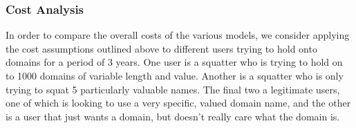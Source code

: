 \subsubsection{Cost Analysis}
    In order to compare the overall costs of the various models, we consider applying the cost assumptions outlined above to different users trying to hold onto domains for a period of 3 years. One user is a squatter who is trying to hold on to 1000 domains of variable length and value. Another is a squatter who is only trying to squat 5 particularly valuable names. The final two a legitimate users, one of which is looking to use a very specific, valued domain name, and the other is a user that just wants a domain, but doesn't really care what the domain is. 


